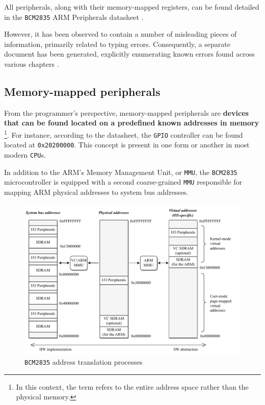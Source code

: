 \documentclass[english, ing, kiv, he, iso690numb, pdf]{fasthesis}
\begin{document}
	All peripherals, along with their memory-mapped registers, can be found detailed in the \texttt{BCM2835} ARM Peripherals datasheet \cite{BCM2835}. 
	
	\begin{important}
		However, it has been observed to contain a number of misleading pieces of information, primarily related to typing errors. Consequently, a separate document has been generated, explicitly enumerating known errors found across various chapters \cite{BCM2835_datasheet_errata}.
	\end{important}
	
	\newpage
	
	\subsection{Memory-mapped peripherals}
	
	From the programmer's perspective, memory-mapped peripherals are \textbf{devices that can be found located on a predefined known addresses in memory} \footnote{In this context, the term  refers to the entire address space rather than the physical memory.}. For instance, according to the datasheet, the \texttt{GPIO} controller can be found located at \texttt{0x20200000}. This concept is present in one form or another in most modern \texttt{CPU}s.
	
	In addition to the ARM's Memory Management Unit, or \texttt{MMU}, the \texttt{BCM2835} microcontroller is equipped with a second coarse-grained \texttt{MMU} responsible for mapping ARM physical addresses to system bus addresses.
	
	\begin{figure}[ht]
		\centering
		\includegraphics[width=1.0\textwidth]{img/diagrams/mmio.pdf}
		\caption{\texttt{BCM2835} address translation processes\protect\footnotemark}
		\label{BCM2835 address translation processes}
	\end{figure}
	
\end{document}
